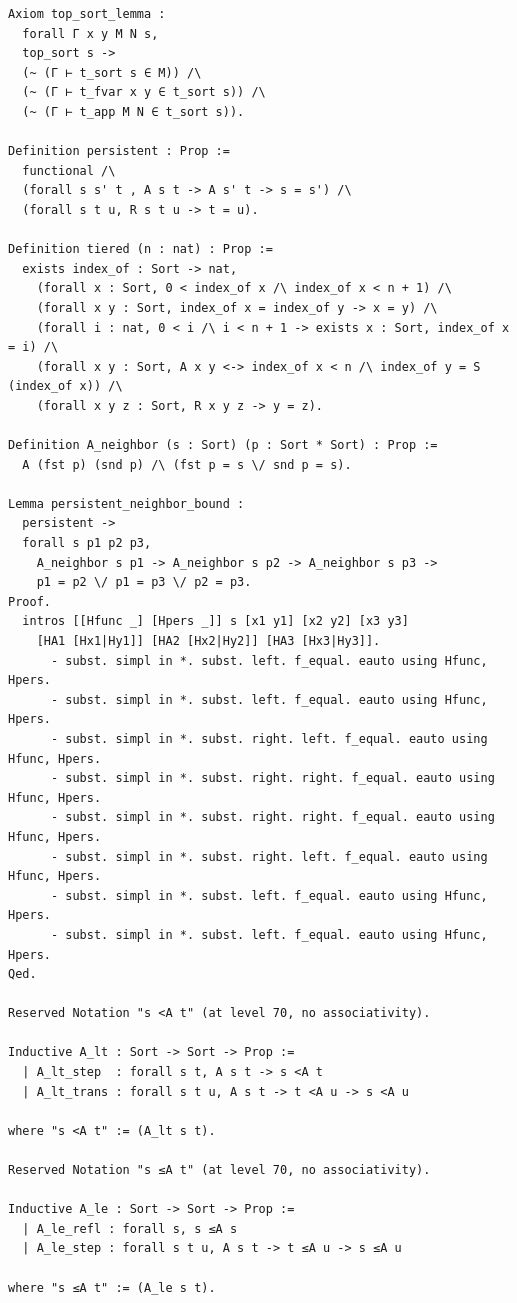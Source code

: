 \begin{latin}
\begin{verbatim}
Axiom top_sort_lemma :
  forall Γ x y M N s,
  top_sort s ->
  (~ (Γ ⊢ t_sort s ∈ M)) /\
  (~ (Γ ⊢ t_fvar x y ∈ t_sort s)) /\
  (~ (Γ ⊢ t_app M N ∈ t_sort s)).

Definition persistent : Prop :=
  functional /\
  (forall s s' t , A s t -> A s' t -> s = s') /\ 
  (forall s t u, R s t u -> t = u).

Definition tiered (n : nat) : Prop :=
  exists index_of : Sort -> nat,
    (forall x : Sort, 0 < index_of x /\ index_of x < n + 1) /\
    (forall x y : Sort, index_of x = index_of y -> x = y) /\
    (forall i : nat, 0 < i /\ i < n + 1 -> exists x : Sort, index_of x = i) /\
    (forall x y : Sort, A x y <-> index_of x < n /\ index_of y = S (index_of x)) /\
    (forall x y z : Sort, R x y z -> y = z).

Definition A_neighbor (s : Sort) (p : Sort * Sort) : Prop :=
  A (fst p) (snd p) /\ (fst p = s \/ snd p = s).

Lemma persistent_neighbor_bound :
  persistent ->
  forall s p1 p2 p3,
    A_neighbor s p1 -> A_neighbor s p2 -> A_neighbor s p3 ->
    p1 = p2 \/ p1 = p3 \/ p2 = p3.
Proof.
  intros [[Hfunc _] [Hpers _]] s [x1 y1] [x2 y2] [x3 y3]
    [HA1 [Hx1|Hy1]] [HA2 [Hx2|Hy2]] [HA3 [Hx3|Hy3]].
      - subst. simpl in *. subst. left. f_equal. eauto using Hfunc, Hpers.
      - subst. simpl in *. subst. left. f_equal. eauto using Hfunc, Hpers.
      - subst. simpl in *. subst. right. left. f_equal. eauto using Hfunc, Hpers.
      - subst. simpl in *. subst. right. right. f_equal. eauto using Hfunc, Hpers.
      - subst. simpl in *. subst. right. right. f_equal. eauto using Hfunc, Hpers.
      - subst. simpl in *. subst. right. left. f_equal. eauto using Hfunc, Hpers.
      - subst. simpl in *. subst. left. f_equal. eauto using Hfunc, Hpers.
      - subst. simpl in *. subst. left. f_equal. eauto using Hfunc, Hpers.
Qed.

Reserved Notation "s <A t" (at level 70, no associativity).

Inductive A_lt : Sort -> Sort -> Prop :=
  | A_lt_step  : forall s t, A s t -> s <A t
  | A_lt_trans : forall s t u, A s t -> t <A u -> s <A u

where "s <A t" := (A_lt s t). 

Reserved Notation "s ≤A t" (at level 70, no associativity).

Inductive A_le : Sort -> Sort -> Prop :=
  | A_le_refl : forall s, s ≤A s
  | A_le_step : forall s t u, A s t -> t ≤A u -> s ≤A u

where "s ≤A t" := (A_le s t).


\end{verbatim}
\end{latin}
